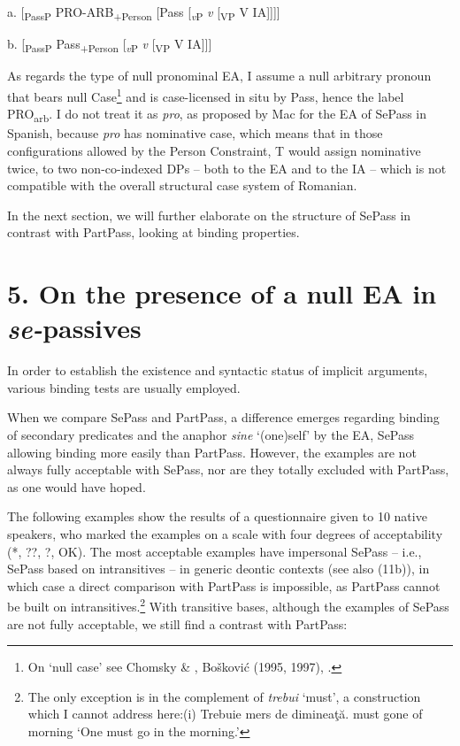\documentclass[output=paper]{langsci/langscibook}
\begin{document}
\ea%
    \label{ex:key:40}
    \gll\\
        \\
    \glt
    \z

          a.   [\textsubscript{PassP} PRO-ARB\textsubscript{+Person} [Pass [\textit{\textsubscript{v}}\textsubscript{P} \textit{v} [\textsubscript{VP} V IA]]]]

b.   [\textsubscript{PassP} Pass\textsubscript{+Person} [\textit{\textsubscript{v}}\textsubscript{P} \textit{v} [\textsubscript{VP} V IA]]]

As regards the type of null pronominal EA, I assume a null arbitrary pronoun that bears null Case\footnote{On ‘null case’ see Chomsky \& \citet{Lasnik1993}, Bošković (1995, 1997), \citet{Martin2001}.}  and is case-licensed in situ by Pass, hence the label PRO\textsubscript{arb}. I do not treat it as \textit{pro}, as proposed by Mac\citet{Donald2017} for the EA of SePass in Spanish, because \textit{pro} has nominative case, which means that in those configurations allowed by the Person Constraint, T would assign nominative twice, to two non-co-indexed DPs – both to the EA and to the IA – which is not compatible with the overall structural case system of Romanian.

In the next section, we will further elaborate on the structure of SePass in contrast with PartPass, looking at binding properties.

\section{ 5. On the presence of a null EA in \textit{se-}passives}

In order to establish the existence and syntactic status of implicit arguments, various binding tests are usually employed.

  When we compare SePass and PartPass, a difference emerges regarding binding of secondary predicates and the anaphor \textit{sine} ‘(one)self’ by the EA, SePass allowing binding more easily than PartPass. However, the examples are not always fully acceptable with SePass, nor are they totally excluded with PartPass, as one would have hoped.

  The following examples show the results of a questionnaire given to 10 native speakers, who marked the examples on a scale with four degrees of acceptability (*, ??, ?, OK). The most acceptable examples have impersonal SePass – i.e., SePass based on intransitives – in generic deontic contexts (see also (11b)), in which case a direct comparison with PartPass is impossible, as PartPass cannot be built on intransitives.\footnote{The only exception is in the complement of \textit{trebui} ‘must’, a construction which I cannot address here:(i)  Trebuie mers de dimineaţă.  must     gone  of morning  ‘One must go in the morning.’} With transitive bases, although the examples of SePass are not fully acceptable, we still find a contrast with PartPass:
\end{document}
